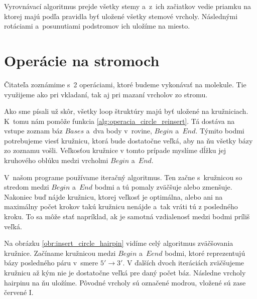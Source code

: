 Vyrovnávací algoritmus prejde všetky stemy a~z~ich začiatkov vedie priamku na ktorej
majú podľa pravidla byť uložené všetky stemové vrcholy. Následnými rotáciami
a~posunutiami podstromov ich uložíme na miesto.




\section{Operácie na stromoch}

Čitateľa zoznámime s~2 operáciami, ktoré budeme vykonávať na molekule. Tie využijeme
ako pri vkladaní, tak aj pri mazaní vrcholov zo stromu.



Ako sme písali už skôr, všetky loop štruktúry majú byť uložené na kružniciach.
K~tomu nám pomôže funkcia \ref{alg:operacia_circle_reinsert}.
Tá dostáva na vstupe zoznam báz $Bases$ a~dva body v~rovine, $Begin$ a~$End$.
Týmito bodmi potrebujeme viesť kružnicu, ktorá bude dostatočne veľká, aby
na ňu všetky bázy zo zoznamu vošli. Veľkosťou kružnice v tomto prípade myslíme
dĺžku jej kruhového oblúku medzi vrcholmi $Begin$ a~$End$.

V~našom programe používame iteračný algoritmus. Ten začne s~kružnicou so stredom
medzi $Begin$ a~$End$ bodmi a tú pomaly zväčšuje alebo zmenšuje.
Nakoniec buď nájde kružnicu, ktorej veľkosť je optimálna, alebo ani na maximálny
počet krokov takú kružnicu nenájde a~tak vráti tú z posledného kroku.
To sa môže stať napríklad, ak je samotná vzdialenosť medzi bodmi príliš veľká.

Na obrázku \ref{obr:insert_circle_hairpin} vidíme celý algoritmus zväčšovania kružnice.
Začíname kružnicou medzi $Begin$ a~$Eend$ bodmi, ktoré reprezentujú bázy posledného
páru v~smere $5' \to 3'$. V ďalších dvoch iteráciách zväčšujeme kružnicu až kým
nie je dostatočne veľká pre daný počet báz. Následne vrcholy hairpinu na ňu uložíme.
Pôvodné vrcholy sú označené modrou, vložené sú zase červené I.

\renewcommand{\wi}{0.24\textwidth}

